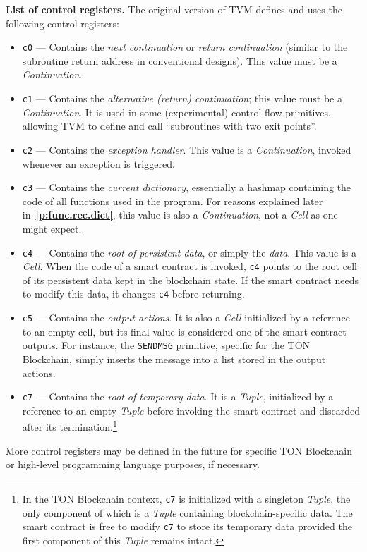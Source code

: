 \documentclass[12pt,oneside]{article}
\def\makepoint#1{\medbreak\noindent{\bf #1.\ }}
\def\nxsubpoint{\refstepcounter{subsubsection}%
  \smallbreak\makepoint{\thesubsubsection}}
\def\refpoint#1{{\rm\textbf{\ref{#1}}}}
\let\ptref=\refpoint
\def\emb#1{\textbf{#1.}}
\begin{document}
\nxsubpoint\label{sp:cr.list}\emb{List of control registers}
The original version of TVM defines and uses the following control registers:
\begin{itemize}
\item \texttt{c0} --- Contains the {\em next continuation} or {\em return continuation} (similar to the subroutine return address in conventional designs). This value must be a {\em Continuation}.
\item \texttt{c1} --- Contains the {\em alternative (return) continuation}; this value must be a {\em Continuation}. It is used in some (experimental) control flow primitives, allowing TVM to define and call ``subroutines with two exit points''.
\item \texttt{c2} --- Contains the {\em exception handler}. This value is a {\em Continuation},  invoked whenever an exception is triggered.
\item \texttt{c3} --- Contains the {\em current dictionary}, essentially a hashmap containing the code of all functions used in the program. For reasons explained later in~\ptref{p:func.rec.dict}, this value is also a {\em Continuation}, not a {\em Cell\/} as one might expect.
\item \texttt{c4} --- Contains the {\em root of persistent data}, or simply the {\em data}. This value is a {\em Cell}. When the code of a smart contract is invoked, \texttt{c4} points to the root cell of its persistent data kept in the blockchain state. If the smart contract needs to modify this data, it changes \texttt{c4} before returning.
\item \texttt{c5} --- Contains the {\em output actions}. It is also a {\em Cell\/} initialized by a reference to an empty cell, but its final value is considered one of the smart contract outputs. For instance, the {\tt SENDMSG} primitive, specific for the TON Blockchain, simply inserts the message into a list stored in the output actions.
\item \texttt{c7} --- Contains the {\em root of temporary data}. It is a {\em Tuple}, initialized by a reference to an empty {\em Tuple\/} before invoking the smart contract and discarded after its termination.\footnote{In the TON Blockchain context, \texttt{c7} is initialized with a singleton {\em Tuple}, the only component of which is a {\em Tuple\/} containing blockchain-specific data. The smart contract is free to modify \texttt{c7} to store its temporary data provided the first component of this {\em Tuple\/} remains intact.}
\end{itemize}
More control registers may be defined in the future for specific TON Block\-chain or high-level programming language purposes, if necessary.
\end{document}
